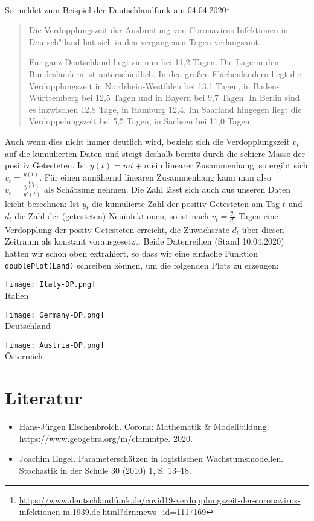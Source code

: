 \documentclass[a4paper,11pt]{article}
\begin{document}
So meldet zum Beispiel der Deutschlandfunk am 04.04.2020\footnote{\raggedright
  \url{https://www.deutschlandfunk.de/covid19-verdopplungszeit-der-coronavirus-infektionen-in.1939.de.html?drn:news_id=1117169}}
\begin{quote}
  Die Verdopplungszeit der Ausbreitung von Coronavirus-Infektionen in
  Deutsch"|land hat sich in den vergangenen Tagen verlangsamt.

  Für ganz Deutschland liegt sie nun bei 11{,}2 Tagen. Die Lage in den
  Bundesländern ist unterschiedlich. In den großen Flächenländern liegt die
  Verdopplungszeit in Nordrhein-Westfalen bei 13{,}1 Tagen, in
  Baden-Württemberg bei 12{,}5 Tagen und in Bayern bei 9{,}7 Tagen. In Berlin
  sind es inzwischen 12{,}8 Tage, in Hamburg 12{,}4. Im Saarland hingegen
  liegt die Verdoppelungszeit bei 5{,}5 Tagen, in Sachsen bei 11{,}0 Tagen.
\end{quote}
Auch wenn dies nicht immer deutlich wird, bezieht sich die Verdopplungszeit
$v_t$ auf die kumulierten Daten und steigt deshalb bereits durch die schiere
Masse der positiv Getesteten.  Ist $y(t)=mt+n$ ein linearer Zusammenhang, so
ergibt sich $v_t=\frac{y(t)}{m}$. Für einen annähernd linearen Zusammenhang
kann man also $v_t=\frac{y(t)}{y'(t)}$ als Schätzung nehmen.  Die Zahl lässt
sich auch aus unseren Daten leicht berechnen: Ist $y_t$ die kumulierte Zahl
der positiv Getesteten am Tag $t$ und $d_t$ die Zahl der (getesteten)
Neuinfektionen, so ist nach $v_t=\frac{y_t}{d_t}$ Tagen eine Verdopplung der
positv Getesteten erreicht, die Zuwachsrate $d_t$ über diesen Zeitraum als
konstant vorausgesetzt.  Beide Datenreihen (Stand 10.04.2020) hatten wir schon
oben extrahiert, so dass wir eine einfache Funktion \texttt{doublePlot(Land)}
schreiben können, um die folgenden Plots zu erzeugen:
\begin{center}  
  \begin{minipage}{.33\textwidth}\centering
    \texttt{[image: Italy-DP.png]}\\[1em] {Italien}
  \end{minipage}\hfill
  \begin{minipage}{.33\textwidth}\centering
    \texttt{[image: Germany-DP.png]}\\[1em] {Deutschland}
  \end{minipage}\hfill
  \begin{minipage}{.33\textwidth}\centering
    \texttt{[image: Austria-DP.png]}\\[1em] {Österreich}
  \end{minipage}
\end{center}


\section{Literatur}

\begin{itemize}
\item Hans-Jürgen Elschenbroich. Corona: Mathematik \& Modellbildung.\\
  \url{https://www.geogebra.org/m/cfammtpe}.  2020.
\item Joachim Engel. Parameterschätzen in logistischen Wachstumsmodellen.
  Stochastik in der Schule 30 (2010) 1, S. 13–18.
\end{itemize}
\end{document}
